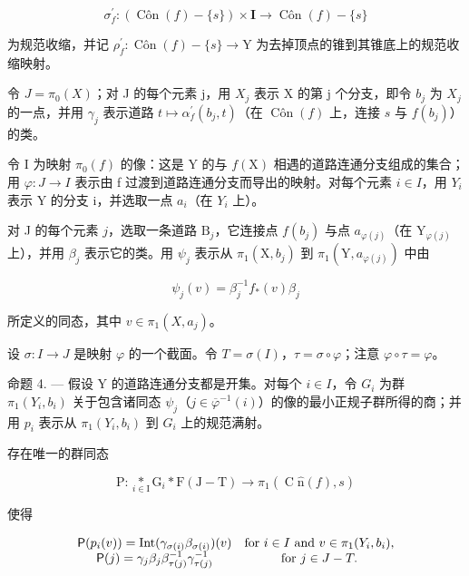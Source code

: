 \[
\sigma_ {f} ^ {\prime} \colon (\operatorname{Côn} (f) - \{s \}) \times \mathbf {I} \to \operatorname{Côn} (f) - \{s \}
\]

为规范收缩，并记 \(\rho_{f}^{\prime}\colon\operatorname{Côn}(f) - \{s\}\to\mathrm{Y}\) 为去掉顶点的锥到其锥底上的规范收缩映射。

令 \(J = \pi_{0}(X)\)；对 J 的每个元素 j，用 \(X_{j}\) 表示 X 的第 j 个分支，即令 \(b_{j}\) 为 \(X_{j}\) 的一点，并用 \(\gamma_{j}\) 表示道路 \(t \mapsto \alpha_{f}^{\prime}(b_{j}, t)\)（在 \(\operatorname{Côn}(f)\) 上，连接 \(s\) 与 \(f(b_{j})\)）的类。

令 I 为映射 \(\pi_{0}(f)\) 的像：这是 Y 的与 \(f(\mathrm{X})\) 相遇的道路连通分支组成的集合；用 \(\varphi\colon J\to I\) 表示由 f 过渡到道路连通分支而导出的映射。对每个元素 \(i\in I\)，用 \(Y_{i}\) 表示 Y 的分支 i，并选取一点 \(a_{i}\)（在 \(Y_{i}\) 上）。

对 J 的每个元素 \(j\)，选取一条道路 \(\mathrm{B}_{j}\)，它连接点 \(f(b_{j})\) 与点 \(a_{\varphi(j)}\)（在 \(\mathrm{Y}_{\varphi(j)}\) 上），并用 \(\beta_{j}\) 表示它的类。用 \(\psi_{j}\) 表示从 \(\pi_{1}(\mathrm{X},b_{j})\) 到 \(\pi_{1}(\mathrm{Y},a_{\varphi(j)})\) 中由

\[
\psi_ {j} (v) = \beta_ {j} ^ {- 1} f _ {*} (v) \beta_ {j}
\]

所定义的同态，其中 \(v \in \pi_1(X, a_j)\)。

设 \(\sigma\colon I\to J\) 是映射 \(\varphi\) 的一个截面。令 \(T=\sigma(I)\)，\(\tau=\sigma\circ\varphi\)；注意 \(\varphi\circ\tau=\varphi\)。

命题 4. --- 假设 Y 的道路连通分支都是开集。对每个 \(i \in I\)，令 \(G_i\) 为群 \(\pi_1(Y_i, b_i)\) 关于包含诸同态 \(\psi_j\)（\(j \in \overline{\varphi}^{-1}(i)\)）的像的最小正规子群所得的商；并用 \(p_i\) 表示从 \(\pi_1(Y_i, b_i)\) 到 \(G_i\) 上的规范满射。

存在唯一的群同态

\[
\mathrm{P} \colon \underset {i \in \mathrm{I}} {*} \mathrm{G} _ {i} * \mathrm{F} (\mathrm{J} - \mathrm{T}) \to \pi_ {1} (\operatorname{C} \hat {\mathrm{n}} (f), s)
\]

使得

\[
\begin{array}{c c} \mathsf {P} (p _ {i} (v)) = \operatorname{Int} (\gamma_ {\sigma (i)} \beta_ {\sigma (i)}) (v) & \text {for } i\in I \text { and } v\in\pi_{1} (Y_{i},b_{i}), \\ \mathsf {P} (j) = \gamma_ {j} \beta_ {j} \beta_ {\tau (j)} ^ {- 1} \gamma_ {\tau (j)} ^ {- 1} & \text {for } j\in J - T. \end{array}
\]

